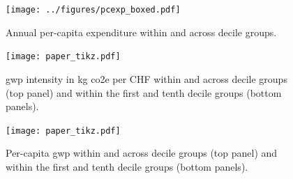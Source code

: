 \documentclass[a4paper,11pt,abstract=true]{scrartcl}
\begin{document}
\begin{figure}[htp]
  \centering
  \texttt{[image: ../figures/pcexp\_boxed.pdf]}
  \caption[Expenditures]{Annual per-capita expenditure within and across decile groups. }
  \label{fig:exp}
\end{figure}

\begin{figure}[htp]
  \centering
  \texttt{[image: paper\_tikz.pdf]}
  \caption[\ac{gwp} per CHF across deciles]{\ac{gwp} intensity in kg \ac{co2e} per CHF within and across decile groups (top panel) and within the first and tenth decile groups (bottom panels). }
  \label{fig:gwp_chf}
\end{figure}

\begin{figure}[htp]
  \centering
  \texttt{[image: paper\_tikz.pdf]}
  \caption[\ac{gwp} across deciles]{Per-capita \ac{gwp} within and across decile groups (top panel) and within the first and tenth decile groups (bottom panels). }
  \label{fig:gwp}
\end{figure}
\end{document}
